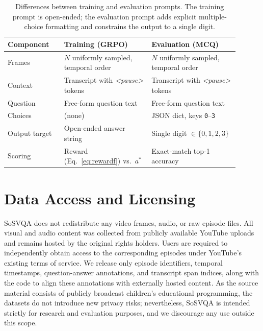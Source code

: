 \documentclass{article}
\newcommand{\cmark}{\ding{51}}
\newcommand{\xmark}{\ding{55}}
\begin{document}
\begin{table}[h]
\centering
\small
\setlength{\tabcolsep}{6pt}
\renewcommand{\arraystretch}{1.15}
\begin{tabular}{@{}p{0.22\linewidth} p{0.34\linewidth} p{0.34\linewidth}@{}}
\toprule
\textbf{Component} & \textbf{Training (GRPO)} & \textbf{Evaluation (MCQ)} \\
\midrule
Frames & $N$ uniformly sampled, temporal order & $N$ uniformly sampled, temporal order \\
Context & Transcript with \textit{<pause>} tokens & Transcript with \textit{<pause>} tokens \\
Question & Free-form question text & Free-form question text \\
Choices & \xmark{} (none) & \cmark{} JSON dict, keys \texttt{0}--\texttt{3} \\
Output target & Open-ended answer string & Single digit $\in \{0,1,2,3\}$ \\
Scoring & Reward (Eq.~\ref{eq:rewardf}) vs.\ $a^{*}$ & Exact-match top-1 accuracy \\
\bottomrule
\end{tabular}
\caption{Differences between training and evaluation prompts. The
training prompt is open-ended; the evaluation prompt adds explicit
multiple-choice formatting and constrains the output to a single digit.}
\label{tab:prompt_components}
\end{table}


\section{Data Access and Licensing}
\label{sec:licensing}
SoSVQA does not redistribute any video frames, audio, or raw episode files. All visual
and audio content was collected from publicly available YouTube uploads and remains
hosted by the original rights holders. Users are required to independently obtain access
to the corresponding episodes under YouTube's existing terms of service. We release only
episode identifiers, temporal timestamps, question-answer annotations, and transcript
span indices, along with the code to align these annotations with externally hosted
content. As the source material consists of publicly broadcast children's educational
programming, the datasets do not introduce new privacy risks; nevertheless, SoSVQA is
intended strictly for research and evaluation purposes, and we discourage any use
outside this scope.

\additionalquality

\newpage

\end{document}
